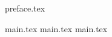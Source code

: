 \documentclass{myclass}
\begin{document}

\frontmatter

\maketitle

\tableofcontents

{preface.tex}


\mainmatter


{main.tex}
{main.tex}
{main.tex}


\backmatter

\printindex
\end{document}

